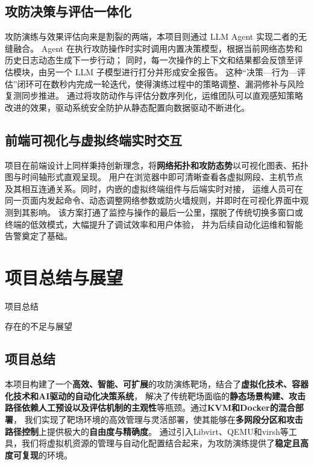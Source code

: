 \documentclass[lang=cn,10pt]{elegantbook}
\begin{document}
\section{攻防决策与评估一体化}  
攻防演练与效果评估向来是割裂的两端，本项目则通过 LLM Agent 实现二者的无缝融合。
Agent 在执行攻防操作时实时调用内置决策模型，根据当前网络态势和历史日志动态生成下一步行动；
同时，每一次操作的上下文和结果都会反馈至评估模块，由另一个 LLM 子模型进行打分并形成安全报告。
这种“决策—行为—评估”闭环可在数秒内完成一轮迭代，使得演练过程中的策略调整、漏洞修补与风险复测同步推进。
通过将攻防动作与评估分数序列化，运维团队可以直观感知策略改进的效果，驱动系统安全防护从静态配置向数据驱动不断进化。

\section{前端可视化与虚拟终端实时交互}  
项目在前端设计上同样秉持创新理念，将\textbf{网络拓扑和攻防态势}以可视化图表、拓扑图与时间轴形式直观呈现。
用户在浏览器中即可清晰查看各虚拟网段、主机节点及其相互连通关系。同时，内嵌的虚拟终端组件与后端实时对接，
运维人员可在同一页面内发起命令、动态调整网络参数或防火墙规则，并即时在可视化界面中观测到其影响。
该方案打通了监控与操作的最后一公里，摆脱了传统切换多窗口或终端的低效模式，大幅提升了调试效率和用户体验，
并为后续自动化运维和智能告警奠定了基础。


\chapter{项目总结与展望}
\begin{introduction}
  \item 项目总结
  \item 存在的不足与展望
\end{introduction}

\section{项目总结}

本项目构建了一个\textbf{高效、智能、可扩展}的攻防演练靶场，结合了\textbf{虚拟化技术、容器化技术和AI驱动的自动化决策系统}，
解决了传统靶场面临的\textbf{静态场景构建、攻击路径依赖人工预设以及评估机制的主观性}等瓶颈。通过\textbf{KVM和Docker的混合部署}，
我们实现了靶场环境的高效管理与灵活部署，使其能够在\textbf{多网段分区和攻击路径控制}上提供极大的\textbf{自由度与精确度}。
通过引入Libvirt、QEMU和virsh等工具，我们将虚拟机资源的管理与自动化配置结合起来，为攻防演练提供了\textbf{稳定且高度可复现}的环境。
\end{document}

